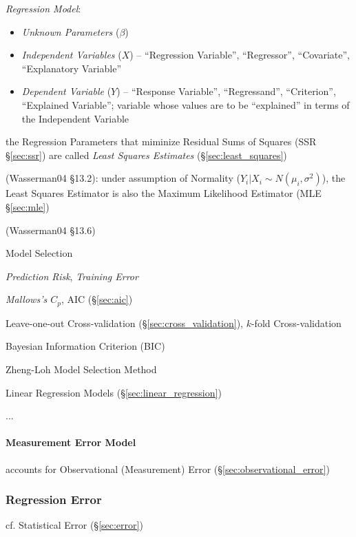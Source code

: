 \emph{Regression Model}:
\begin{itemize}
  \item \emph{Unknown Parameters} ($\beta$)
  \item \emph{Independent Variables} ($X$) -- ``Regression Variable'',
    ``Regressor'', ``Covariate'', ``Explanatory Variable''
  \item \emph{Dependent Variable} ($Y$) -- ``Response Variable'',
    ``Regressand'', ``Criterion'', ``Explained Variable''; variable whose values
    are to be ``explained'' in terms of the Independent Variable
\end{itemize}

the Regression Parameters that miminize Residual Sums of Squares (SSR
\S\ref{sec:ssr}) are called \emph{Least Squares Estimates}
(\S\ref{sec:least_squares})

(Wasserman04 \S13.2):
 under assumption of Normality ($Y_i | X_i \sim N(\mu_i, \sigma^2)$), the Least
 Squares Estimator is also the Maximum Likelihood Estimator (MLE
 \S\ref{sec:mle})

(Wasserman04 \S13.6)

Model Selection

\emph{Prediction Risk}, \emph{Training Error}

\emph{Mallows's $C_p$}, AIC (\S\ref{sec:aic})

Leave-one-out Cross-validation (\S\ref{sec:cross_validation}),
$k$-fold Cross-validation

Bayesian Information Criterion (BIC) %

Zheng-Loh Model Selection Method

Linear Regression Models (\S\ref{sec:linear_regression})

...



\paragraph{Measurement Error Model}\label{sec:measurement_error_model}\hfill

accounts for Observational (Measurement) Error (\S\ref{sec:observational_error})



\subsubsection{Regression Error}\label{sec:regression_error}

\fist cf. Statistical Error (\S\ref{sec:error})

